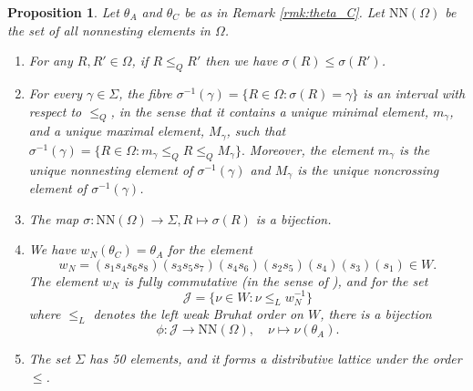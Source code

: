 \documentclass[11pt]{amsart}
\theoremstyle{plain}
\newtheorem{prop}[theorem]{Proposition}
\theoremstyle{definition}
\theoremstyle{remark}
\numberwithin{equation}{section}
\newcommand{\al}{\alpha}
\newcommand{\ra}{\rightarrow}
\newcommand{\wnn}{w_{N}}
\newcommand{\calj}{\mathcal{J}}
\newcommand{\ob}{\Omega}
\newcommand{\nn}{\mathrm{NN}}
\newcommand{\inverse}{^{-1}}
\begin{document}
\begin{prop}
\label{prop:Sigma}
Let $\theta_A$ and $\theta_C$ be as in Remark \ref{rmk:theta_C}. Let
$\nn(\ob)$ be the set of all nonnesting elements in $\ob$.
\begin{enumerate} 
\item For any $R,R'\in \ob$, if $R\le_Q R'$ then we have $\sigma(R)\le
  \sigma(R')$.

\item For every $\gamma\in \Sigma$, the fibre $\sigma\inverse(\gamma)=\{R\in
  \ob:\sigma(R)=\gamma\}$ is an interval with respect to $\le_Q$, in the sense
  that it contains a unique minimal element, $m_\gamma$, and a unique maximal
  element, $M_\gamma$, such that $ \sigma\inverse(\gamma)=\{R\in
  \ob:m_\gamma\le_Q R\le_Q M_\gamma\}. $ Moreover, the element $m_\gamma$ is the
  unique nonnesting element of $\sigma\inverse(\gamma)$ and $M_\gamma$ is the
  unique noncrossing element of $\sigma\inverse(\gamma)$.

\item The map $\sigma:\nn(\ob)\ra\Sigma, R\mapsto \sigma(R)$ is a bijection.


\item We have $\wnn(\theta_C)=\theta_A$ for the element
  \begin{equation}\label{eq:w}
    \wnn=(s_1s_4s_6s_8)(s_3s_5s_7)(s_4s_6)(s_2s_5)(s_4)(s_3)(s_1)\in W. 
  \end{equation}
The element $\wnn$ is fully commutative \textup{(}in the sense of \cite{FC}\textup{)}, and for the set 
 \[
    \mathcal{J}=\{\nu\in W:\nu\le_L \wnn\inverse \} 
  \]
where $\le_L$ denotes the left weak Bruhat order on $W$, there is
  a bijection   
  \begin{equation}\label{eq:elt_to_sum} 
    \phi: \calj \ra \nn(\ob), \quad \nu\mapsto  \nu(\theta_A).
  \end{equation}
\item The set $\Sigma$ has 50 elements, and it forms a
  distributive lattice under the order $\le$.
%  
\end{enumerate}
\end{prop}
\end{document}

